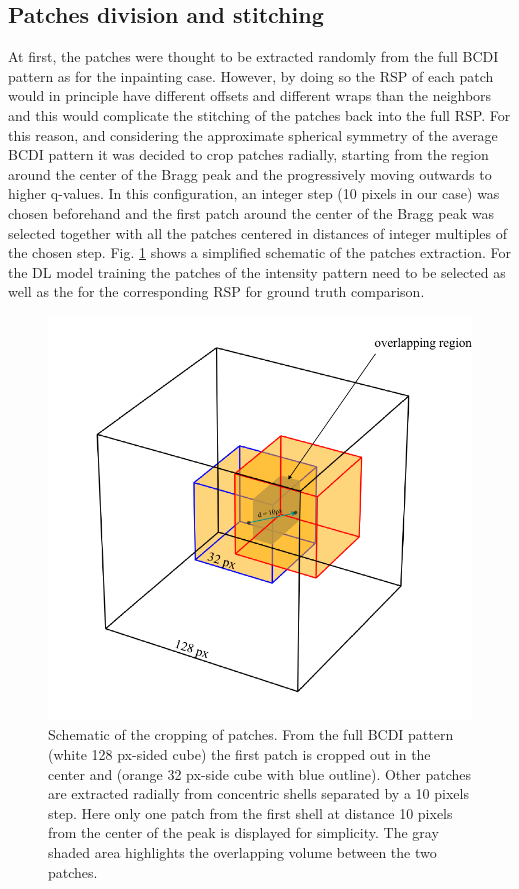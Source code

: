 \subsection{Patches division and stitching}
At first, the patches were thought to be extracted randomly from the full BCDI pattern as for the inpainting case. 
However, by doing so the RSP of each patch would in principle have different offsets and different wraps than the neighbors 
and this would complicate the stitching of the patches back into the full RSP. 
For this reason, and considering the approximate spherical symmetry of the average BCDI pattern it was decided to crop patches radially, 
starting from the region around the center of the Bragg peak and the progressively moving outwards to higher q-values. 
In this configuration, an integer step (10 pixels in our case) was chosen beforehand and the first patch around the center 
of the Bragg peak was selected together with all the patches centered in distances of integer multiples of the chosen step. 
Fig. \ref{fig:patches_cropping} shows a simplified schematic of the patches extraction. 
For the DL model training the patches of the intensity pattern need to be selected as well as the for the corresponding 
RSP for ground truth comparison. 


\begin{figure}[H]
    \centering
    \includegraphics[width=\textwidth]{figures/Phasing/patching_cropping.pdf}
    \caption{Schematic of the cropping of patches. From the full BCDI pattern (white 128 px-sided cube) the first patch is 
    cropped out in the center and (orange 32 px-side cube with blue outline). Other patches are extracted radially from 
    concentric shells separated by a 10 pixels step. Here only one patch from the first shell at distance 10 pixels from the 
    center of the peak is displayed for simplicity. The gray shaded area highlights the overlapping volume between the 
    two patches. }
    
    \label{fig:patches_cropping}
\end{figure}

